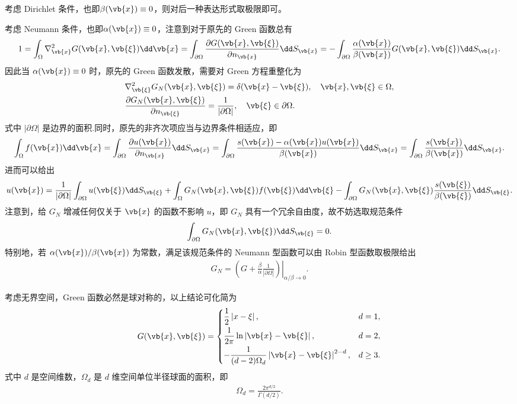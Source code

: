 考虑 Dirichlet 条件，也即\(\beta(\vb{x})\equiv0\)，则对后一种表达形式取极限即可。

考虑 Neumann 条件，也即\(\alpha(\vb{x})\equiv0\)，注意到对于原先的 Green 函数总有
\begin{align*}
	1=\int_\Omega\nabla_{\vb{x}}^2G(\vb{x},\vb{\xi})\dd\vb{x}
	=\int_{\partial\Omega}\frac{\partial G(\vb{x},\vb{\xi})}{\partial n_{\vb{x}}}\dd S_{\vb{x}}
	=-\int_{\partial\Omega}\frac{\alpha(\vb{x})}{\beta(\vb{x})}G(\vb{x},\vb{\xi})\dd S_{\vb{x}}.
\end{align*}
因此当 \(\alpha(\vb{x})\equiv0\) 时，原先的 Green 函数发散，需要对 Green 方程重整化为
\begin{align*}
	&\nabla_{\vb{\xi}}^2G_N(\vb{x},\vb{\xi})=\delta(\vb{x}-\vb{\xi}),\quad \vb{x},\vb{\xi}\in\Omega,\\
	&\frac{\partial G_N(\vb{x},\vb{\xi})}{\partial n_{\vb{\xi}}}=\frac{1}{\left|\partial\Omega\right|},
	\quad \vb{\xi}\in\partial\Omega.
\end{align*}
式中 \(\left|\partial\Omega\right|\) 是边界的面积.同时，原先的非齐次项应当与边界条件相适应，即
\begin{align*}
	\int_\Omega f(\vb{x})\dd\vb{x}
	=\int_{\partial\Omega}\frac{\partial u(\vb{x})}{\partial n_{\vb{x}}}\dd S_{\vb{x}}
	=\int_{\partial\Omega}\frac{s(\vb{x})-\alpha(\vb{x})u(\vb{x})}{\beta(\vb{x})}\dd S_{\vb{x}}
	=\int_{\partial\Omega}\frac{s(\vb{x})}{\beta(\vb{x})}\dd S_{\vb{x}}.
\end{align*}
进而可以给出
\begin{align*}
	u(\vb{x})
	=\frac{1}{\left|\partial\Omega\right|}\int_{\partial\Omega}u(\vb{\xi})\dd S_{\vb{\xi}}
	+\int_\Omega G_N(\vb{x},\vb{\xi})f(\vb{\xi})\dd\vb{\xi}
	-\int_{\partial\Omega}G_N(\vb{x},\vb{\xi})\frac{s(\vb{\xi})}{\beta(\vb{\xi})}\dd S_{\vb{\xi}}.
\end{align*}
注意到，给 \(G_N\) 增减任何仅关于 \(\vb{x}\) 的函数不影响 \(u\)，即 \(G_N\) 具有一个冗余自由度，故不妨选取规范条件
\begin{align*}
	\int_{\partial\Omega}G_N(\vb{x},\vb{\xi})\dd S_{\vb{\xi}}=0.
\end{align*}
特别地，若 \(\alpha(\vb{x})/\beta(\vb{x})\) 为常数，满足该规范条件的 Neumann 型函数可以由 Robin 型函数取极限给出
\begin{align*}
	G_N=\left.\left(G+\frac{\beta}{\alpha}\frac{1}{\left|\partial\Omega\right|}\right)\right|_{\alpha/\beta\to0}.
\end{align*}

考虑无界空间，Green 函数必然是球对称的，以上结论可化简为
\begin{align*}
	G(\vb{x},\vb{\xi})=
	\begin{cases}
		\dfrac{1}{2}\left|x-\xi\right|, & d=1,\\[6pt]
		\dfrac{1}{2\pi}\ln\left|\vb{x}-\vb{\xi}\right|, & d=2,\\[6pt]
		-\dfrac{1}{(d-2)\Omega_d}\left|\vb{x}-\vb{\xi}\right|^{2-d}, & d\geq3.
	\end{cases}
\end{align*}
式中 \(d\) 是空间维数，\(\Omega_d\) 是 \(d\) 维空间单位半径球面的面积，即
\begin{align*}
	\Omega_d=\frac{2\pi^{d/2}}{\Gamma(d/2)}.
\end{align*}

